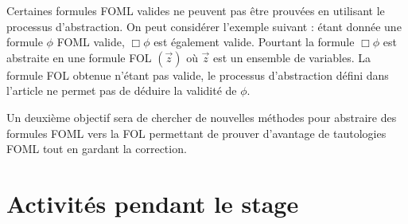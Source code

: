 \documentclass[12pt]{article}
\begin{document}
Certaines formules FOML valides ne peuvent pas être prouvées en utilisant le processus d'abstraction.
On peut considérer l'exemple suivant :
étant donnée une formule $\phi$ FOML valide, $\Box \phi$ est également valide.
Pourtant la formule $\Box \phi$ est abstraite en une formule FOL \fbox{$\Box \phi$}$(\vec{z})$ où $\vec{z}$ est un ensemble de variables.
La formule FOL obtenue n'étant pas valide, le processus d'abstraction défini dans l'article ne permet pas de déduire la validité de $\phi$.

Un deuxième objectif sera de chercher de nouvelles méthodes pour abstraire des formules FOML vers la FOL permettant de prouver d'avantage de tautologies FOML tout en gardant la correction.

\section{Activités pendant le stage}
\end{document}
